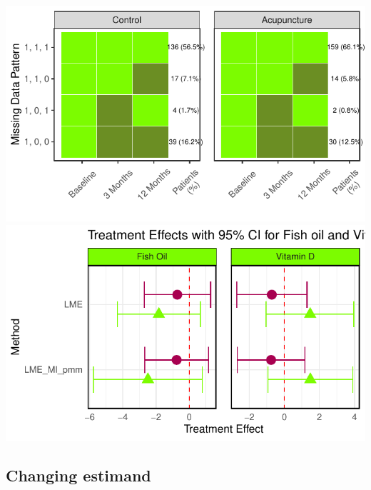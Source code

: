 \documentclass{article}
\begin{document}
\includegraphics{Final_Report_files/figure-latex/unnamed-chunk-20-1.pdf}
\includegraphics{Final_Report_files/figure-latex/unnamed-chunk-20-2.pdf}

\subsection{Changing estimand}\label{changing-estimand}
\end{document}
